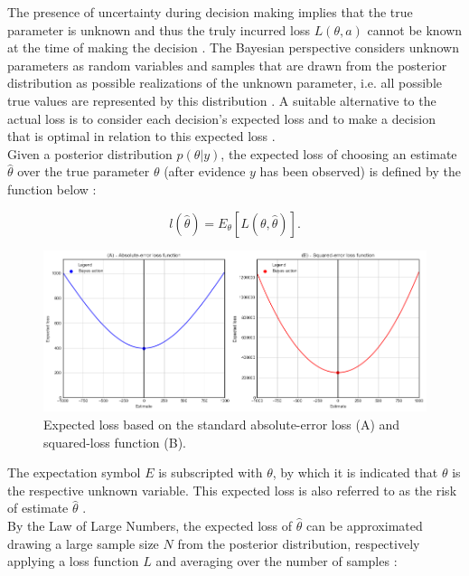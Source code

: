         The presence of uncertainty during decision making implies that the true parameter is unknown and thus the truly incurred loss $L(\theta,a)$ cannot be known at the time of making the decision \citep{berger2013stat, davidson2015}. The Bayesian perspective considers unknown parameters as random variables and samples that are drawn from the posterior distribution as possible realizations of the unknown parameter, i.e. all possible true values are represented by this distribution \citep{davidson2015}. A suitable alternative to the actual loss is to consider each decision's expected loss and to make a decision that is optimal in relation to this expected loss \citep{berger2013stat}. \\        
        Given a posterior distribution $p(\theta|y)$, the expected loss of choosing an estimate $\hat{\theta}$ over the true parameter $\theta$ (after evidence $y$ has been observed) is defined by the function below \citep{davidson2015}:
        
        \begin{equation}\label{eq:ExpectedLoss}
        l(\hat{\theta}) = E_{\theta}[L(\theta,\hat{\theta})].
        \end{equation}  
        
        \begin{figure}[h]
        	\centering
        	\includegraphics[width=1\textwidth]{Figures/loss_functions.png}
        	\caption{Expected loss based on the standard absolute-error loss (A) and squared-loss function (B).}\label{fig:standard_LF} 
        \end{figure}
        
        The expectation symbol $E$ is subscripted with $\theta$, by which it is indicated that $\theta$ is the respective unknown variable. This expected loss is also referred to as the risk of estimate $\hat{\theta}$ \citep{davidson2015}.\\        
        By the Law of Large Numbers, the expected loss of $\hat{\theta}$ can be approximated drawing a large sample size $N$ from the posterior distribution, respectively applying a loss function $L$ and averaging over the number of samples \citep{davidson2015}:
        

